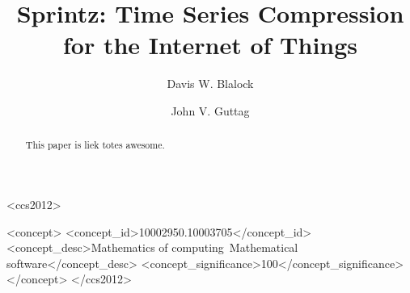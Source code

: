 \documentclass[sigconf]{acmart}  %
\begin{document}



\title{Sprintz: Time Series Compression for the Internet of Things}

\author{Davis W. Blalock}

\author{John V. Guttag}

\begin{abstract}

This paper is liek totes awesome.

\end{abstract}


\begin{CCSXML}
<ccs2012>

<concept>
<concept_id>10002950.10003705</concept_id>
<concept_desc>Mathematics of computing~Mathematical software</concept_desc>
<concept_significance>100</concept_significance>
</concept>
</ccs2012>
\end{CCSXML}



\maketitle
\end{document}
